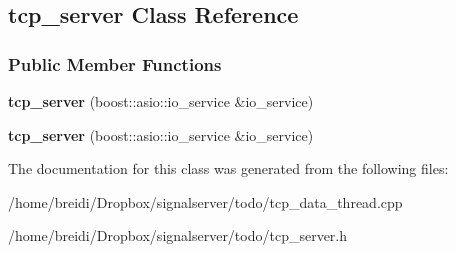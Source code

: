 \hypertarget{classtcp__server}{
\subsection{tcp\_\-server Class Reference}
\label{classtcp__server}
}
\subsubsection*{Public Member Functions}
\begin{DoxyCompactItemize}
\item 
\hypertarget{classtcp__server_a91db67ab96bbe6c7adea476ee859a74b}{
{\bfseries tcp\_\-server} (boost::asio::io\_\-service \&io\_\-service)}
\label{classtcp__server_a91db67ab96bbe6c7adea476ee859a74b}

\item 
\hypertarget{classtcp__server_a91db67ab96bbe6c7adea476ee859a74b}{
{\bfseries tcp\_\-server} (boost::asio::io\_\-service \&io\_\-service)}
\label{classtcp__server_a91db67ab96bbe6c7adea476ee859a74b}

\end{DoxyCompactItemize}


The documentation for this class was generated from the following files:\begin{DoxyCompactItemize}
\item 
/home/breidi/Dropbox/signalserver/todo/tcp\_\-data\_\-thread.cpp\item 
/home/breidi/Dropbox/signalserver/todo/tcp\_\-server.h\end{DoxyCompactItemize}
